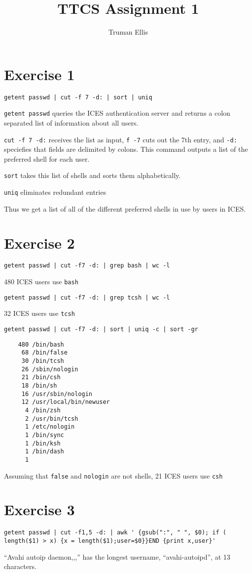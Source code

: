 \documentclass[letterpaper,10pt]{article}
\title{TTCS Assignment 1}
\author{Truman Ellis}
\begin{document}
\maketitle

\section*{Exercise 1}
\verb=getent passwd | cut -f 7 -d: | sort | uniq=

\verb=getent passwd= queries the ICES authentication server and returns a colon
separated list of information about all users.

\verb=cut -f 7 -d:=
receives the list as input, \verb=f -7= cuts out the 7th entry, and \verb=-d:=
speciefies that fields are delimited by colons. This command outputs a list of
the preferred shell for each user.

\verb=sort= takes this list of shells and sorts them alphabetically.

\verb=uniq= eliminates redundant entries

Thus we get a list of all of the different preferred shells in use by users in
ICES.

\section*{Exercise 2}
\verb=getent passwd | cut -f7 -d: | grep bash | wc -l=

480 ICES users use \verb=bash=

\verb=getent passwd | cut -f7 -d: | grep tcsh | wc -l=

32 ICES users use \verb=tcsh=

\verb=getent passwd | cut -f7 -d: | sort | uniq -c | sort -gr=
\begin{verbatim}
    480 /bin/bash
     68 /bin/false
     30 /bin/tcsh
     26 /sbin/nologin
     21 /bin/csh
     18 /bin/sh
     16 /usr/sbin/nologin
     12 /usr/local/bin/newuser
      4 /bin/zsh
      2 /usr/bin/tcsh
      1 /etc/nologin
      1 /bin/sync
      1 /bin/ksh
      1 /bin/dash
      1
\end{verbatim}
Assuming that \verb=false= and \verb=nologin= are not shells, 21 ICES users use
\verb=csh=

\section*{Exercise 3}
\begin{verbatim}getent passwd | cut -f1,5 -d: | awk ' {gsub(":", " ", $0); if (
length($1) > x) {x = length($1);user=$0}}END {print x,user}'
\end{verbatim}
``Avahi autoip daemon,,,'' has the longest username, ``avahi-autoipd'', at 13
characters.
\end{document}

